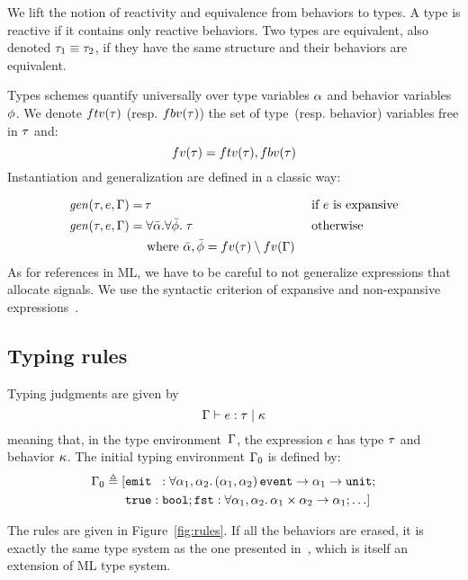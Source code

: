 \documentclass[9pt,preprint]{sigplanconf}
\newcommand{\deq}{\triangleq}
\begin{document}
We lift the notion of reactivity and equivalence from behaviors to types. A type is reactive if it contains only reactive behaviors. Two types are equivalent, also denoted $\tau_1 \equiv \tau_2$, if they have the same structure and their behaviors are equivalent.

Types schemes quantify universally over type variables $\alpha$ and behavior variables $\phi$. We denote $ftv(\tau)$ (resp. $fbv(\tau)$) the set of type~(resp. behavior) variables free in $\tau$ and:
\[ fv(\tau) = ftv(\tau), fbv(\tau) \] 
Instantiation and generalization are defined in a classic way:
\vspace{-1.3em}
\begin{align*}
\mathit{gen}(\tau, e, \Gamma) = &\, \tau && \text { if $e$ is expansive} \\
\mathit{gen}(\tau, e, \Gamma) = &\; \forall \bar{\alpha}.\forall \bar{\phi}.\; \tau  && \text{ otherwise } \\
  & \text{ where }  \bar{\alpha}, \bar{\phi} = fv(\tau) \setminus fv(\Gamma)  
\end{align*}
As for references in ML, we have to be careful to not generalize expressions that allocate signals. We use the syntactic criterion of expansive and non-expansive expressions~\cite{Tofte:1990}.

\subsection{Typing rules}

Typing judgments are given by 
\[ \Gamma \vdash e : \tau \mid \kappa \] 
meaning that, in the type environment~$\Gamma$, the expression $e$ has type $\tau$ and behavior $\kappa$. The initial typing environment $\Gamma_0$ is defined by: 
\begin{align*}
\Gamma_0 \deq [
 &\eemit{}{} : \forall  \rtvar_1, \rtvar_2. \, 
        \rtarrow{ \rtsig{\rtvar_1}{\rtvar_2} }{\rtarrow{\rtvar_1}{\unit{}} }; \\
        &\mathtt{true} : \mathtt{bool};
              \mathtt{fst} : \forall \rtvar_1, \rtvar_2.\, \rtarrow{\rtprod{\rtvar_1}{\rtvar_2}}{\rtvar_1};  \ldots ]
\end{align*}

The rules are given in Figure~\ref{fig:rules}. If all the behaviors are erased, it is exactly the same type system as the one presented in~\cite{Mandel:2005}, which is itself an extension of ML type system. 
\end{document}
